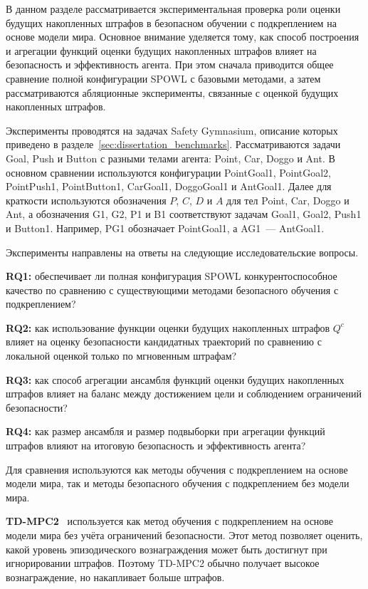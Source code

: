 В данном разделе рассматривается экспериментальная проверка роли оценки будущих накопленных штрафов в безопасном обучении с подкреплением на основе модели мира. Основное внимание уделяется тому, как способ построения и агрегации функций оценки будущих накопленных штрафов влияет на безопасность и эффективность агента. При этом сначала приводится общее сравнение полной конфигурации SPOWL с базовыми методами, а затем рассматриваются абляционные эксперименты, связанные с оценкой будущих накопленных штрафов.

Эксперименты проводятся на задачах Safety Gymnasium, описание которых приведено в разделе~\ref{sec:dissertation_benchmarks}. Рассматриваются задачи Goal, Push и Button с разными телами агента: Point, Car, Doggo и Ant. В основном сравнении используются конфигурации PointGoal1, PointGoal2, PointPush1, PointButton1, CarGoal1, DoggoGoal1 и AntGoal1. Далее для краткости используются обозначения $P$, $C$, $D$ и $A$ для тел Point, Car, Doggo и Ant, а обозначения G1, G2, P1 и B1 соответствуют задачам Goal1, Goal2, Push1 и Button1. Например, PG1 обозначает PointGoal1, а AG1~--- AntGoal1.

Эксперименты направлены на ответы на следующие исследовательские вопросы.

\textbf{RQ1:} обеспечивает ли полная конфигурация SPOWL конкурентоспособное качество по сравнению с существующими методами безопасного обучения с подкреплением?

\textbf{RQ2:} как использование функции оценки будущих накопленных штрафов $Q^c$ влияет на оценку безопасности кандидатных траекторий по сравнению с локальной оценкой только по мгновенным штрафам?

\textbf{RQ3:} как способ агрегации ансамбля функций оценки будущих накопленных штрафов влияет на баланс между достижением цели и соблюдением ограничений безопасности?

\textbf{RQ4:} как размер ансамбля и размер подвыборки при агрегации функций штрафов влияют на итоговую безопасность и эффективность агента?

Для сравнения используются как методы обучения с подкреплением на основе модели мира, так и методы безопасного обучения с подкреплением без модели мира.

\textbf{TD-MPC2}~\cite{hansen2024tdmpc2} используется как метод обучения с подкреплением на основе модели мира без учёта ограничений безопасности. Этот метод позволяет оценить, какой уровень эпизодического вознаграждения может быть достигнут при игнорировании штрафов. Поэтому TD-MPC2 обычно получает высокое вознаграждение, но накапливает больше штрафов.

